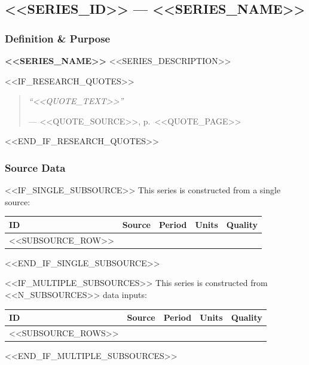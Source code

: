 %

\subsection{<<SERIES_ID>> --- <<SERIES_NAME>>}
\label{sec:<<SERIES_ID>>}

\subsubsection{Definition \& Purpose}

\textbf{<<SERIES_NAME>>} <<SERIES_DESCRIPTION>>

<<IF_RESEARCH_QUOTES>>
\begin{quote}
\itshape ``<<QUOTE_TEXT>>''

\normalfont\small --- <<QUOTE_SOURCE>>, p.~<<QUOTE_PAGE>>
\end{quote}
<<END_IF_RESEARCH_QUOTES>>

\subsubsection{Source Data}

<<IF_SINGLE_SUBSOURCE>>
This series is constructed from a single source:

\begin{tabular}{@{} l l l l l @{}}
\toprule
\textbf{ID} & \textbf{Source} & \textbf{Period} & \textbf{Units} & \textbf{Quality} \\
\midrule
<<SUBSOURCE_ROW>>
\bottomrule
\end{tabular}
<<END_IF_SINGLE_SUBSOURCE>>

<<IF_MULTIPLE_SUBSOURCES>>
This series is constructed from <<N_SUBSOURCES>> data inputs:

\begin{tabular}{@{} l p{5cm} l l l @{}}
\toprule
\textbf{ID} & \textbf{Source} & \textbf{Period} & \textbf{Units} & \textbf{Quality} \\
\midrule
<<SUBSOURCE_ROWS>>
\bottomrule
\end{tabular}
<<END_IF_MULTIPLE_SUBSOURCES>>

